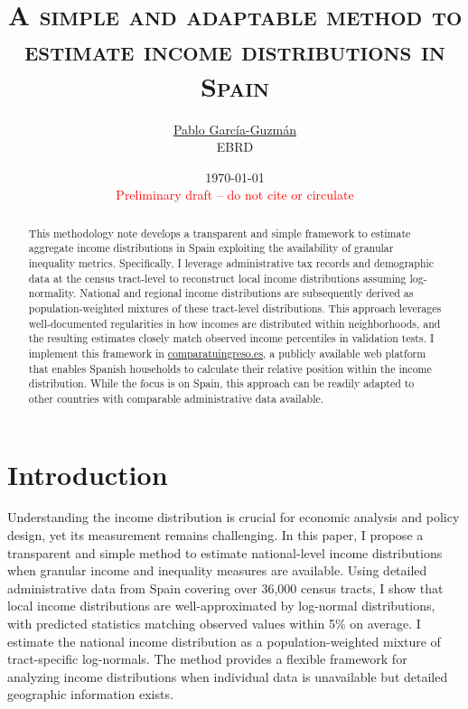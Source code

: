 \documentclass[letterpaper,11pt,leqno]{article}
\begin{document}
\title{\Large \textsc{A simple and adaptable method to estimate income distributions in Spain}}

\author{\href{https://pablogguz.github.io/}{\large{Pablo García-Guzmán}} \\ \normalsize{EBRD}}

\date{\normalsize \today \\ \textcolor{red}{Preliminary draft -- do not cite or circulate}}

\maketitle
\begin{abstract}
\onehalfspacing
This methodology note develops a transparent and simple framework to estimate aggregate income distributions in Spain exploiting the availability of granular inequality metrics. Specifically, I leverage administrative tax records and demographic data at the census tract-level to reconstruct local income distributions assuming log-normality. National and regional income distributions are subsequently derived as population-weighted mixtures of these tract-level distributions. This approach leverages well-documented regularities in how incomes are distributed within neighborhoods, and the resulting estimates closely match observed income percentiles in validation tests. I implement this framework in \href{https://comparatuingreso.es/}{comparatuingreso.es}, a publicly available web platform that enables Spanish households to calculate their relative position within the income distribution. While the focus is on Spain, this approach can be readily adapted to other countries with comparable administrative data available.
\end{abstract}

\thispagestyle{empty}

\newpage

\setcounter{page}{1}

\section{Introduction}

Understanding the income distribution is crucial for economic analysis and policy design, yet its measurement remains challenging. In this paper, I propose a transparent and simple method to estimate national-level income distributions when granular income and inequality measures are available. Using detailed administrative data from Spain covering over 36,000 census tracts, I show that local income distributions are well-approximated by log-normal distributions, with predicted statistics matching observed values within 5\% on average. I estimate the national income distribution as a population-weighted mixture of tract-specific log-normals. The method provides a flexible framework for analyzing income distributions when individual data is unavailable but detailed geographic information exists.
\end{document}
